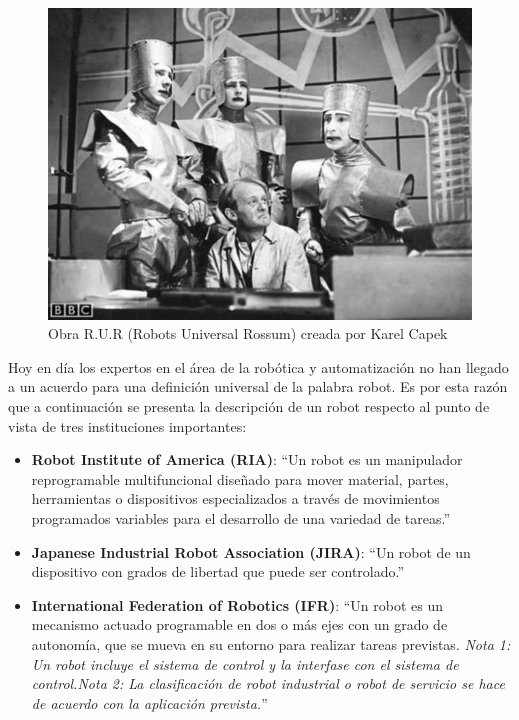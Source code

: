     \begin{figure}[htb]
        \centering
        \includegraphics[width=0.6\linewidth]{Main/Chapter2/Images2/Obra-robots.jpg}
        \caption{Obra R.U.R (Robots Universal Rossum) creada por Karel Capek \cite{cap2_rur}}
        \label{f:Cap2_general_2}
    \end{figure}
    
    Hoy en día los expertos en el área de la robótica y automatización no han llegado a un acuerdo para una definición universal de la palabra robot. Es por esta razón que a continuación se presenta la descripción de un robot respecto al punto de vista de tres instituciones importantes:
    
    \begin{itemize}
    
        \item \textbf{Robot Institute of America (RIA)}: ``Un robot es un manipulador reprogramable multifuncional diseñado para mover material, partes, herramientas o dispositivos especializados a través de movimientos programados variables para el desarrollo de una variedad de tareas.''
        
        \item \textbf{Japanese Industrial Robot Association (JIRA)}: ``Un robot de un dispositivo con grados de libertad que puede ser controlado.''
        
        \item \textbf{International Federation of Robotics (IFR)}: ``Un robot es un mecanismo actuado programable en dos o más ejes con un grado de autonomía, que se mueva en su entorno para realizar tareas previstas.
        \textit{Nota 1: Un robot incluye el sistema de control y la interfase con el sistema de control.}\textit{Nota 2: La clasificación de robot industrial o robot de servicio se hace de acuerdo con la aplicación prevista.}''
        
    \end{itemize}
    
